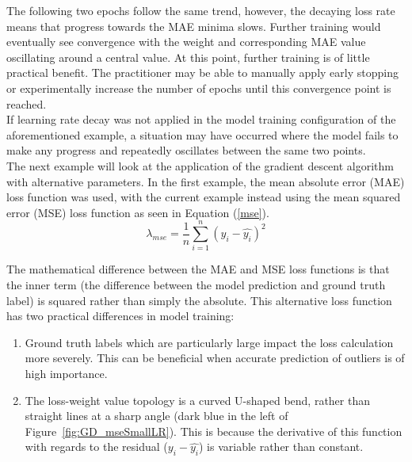 \noindent
The following two epochs follow the same trend, however, the decaying loss rate means that progress towards the MAE minima slows. Further training would eventually see convergence with the weight and corresponding MAE value oscillating around a central value. At this point, further training is of little practical benefit. The practitioner may be able to manually apply early stopping \cite{yao2007early} or experimentally increase the number of epochs until this convergence point is reached. \\ 

\noindent
If learning rate decay was not applied in the model training configuration of the aforementioned example,  a situation may have occurred where the model fails to make any progress and repeatedly oscillates between the same two points. \\

\noindent
The next example will look at the application of the gradient descent algorithm with alternative parameters. In the first example, the mean absolute error (MAE) loss function was used, with the current example instead using the mean squared error (MSE) loss function as seen in Equation (\ref{mse}). \\

\begin{equation} \label{mse}
	\lambda_{mse} = \frac{1}{n}\sum_{i=1}^n (y_i - \hat{y_i})^2
\end{equation}

\noindent
The mathematical difference between the MAE and MSE loss functions is that the inner term (the difference between the model prediction and ground truth label) is squared rather than simply the absolute. This alternative loss function has two practical differences in model training: 

\begin{enumerate}
	\item Ground truth labels which are particularly large impact the loss calculation more severely. This can be beneficial when accurate prediction of outliers is of high importance.
	
	\item The loss-weight value topology is a curved U-shaped bend, rather than straight lines at a sharp angle (dark blue in the left of Figure~\ref{fig:GD_mseSmallLR}). This is because the derivative of this function with regards to the residual ($y_i - \hat{y_i}$) is variable rather than constant.
\end{enumerate}

